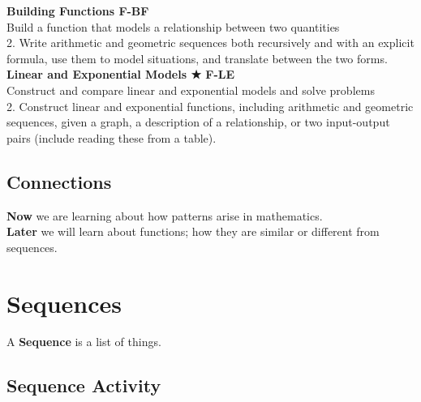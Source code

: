 \documentclass[12pt]{article}
\begin{document}
\textbf{Building Functions 	\hfill F-BF}\\

Build a function that models a relationship between two quantities\\

2.	 Write arithmetic and geometric sequences both recursively and
with an explicit formula, use them to model situations, and translate
between the two forms. \\

\textbf{Linear and Exponential Models ★ \hfill 	F-LE}\\

Construct and compare linear and exponential models and solve
problems\\

2.	 Construct linear and exponential functions, including arithmetic and
geometric sequences, given a graph, a description of a relationship, or
two input-output pairs (include reading these from a table).\\

\subsection{Connections}

\textbf{Now} we are learning about how patterns arise in mathematics.\\

\textbf{Later} we will learn about functions; how they are similar or different from sequences.\\

\let\stdsection\section
\renewcommand\section{\newpage\stdsection}


\section{Sequences}

A \textbf{Sequence} is a list of things.\\

\subsection{Sequence Activity}
\end{document}
